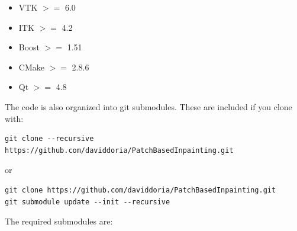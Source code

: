 \documentclass{InsightArticle}
\begin{document}
\begin{itemize}
 \item VTK $>=$ 6.0
 \item ITK $>=$ 4.2
 \item Boost $>=$ 1.51
 \item CMake $>=$ 2.8.6
 \item Qt $>=$ 4.8
\end{itemize}

The code is also organized into git submodules. These are included if you clone with:
\begin{verbatim}
git clone --recursive https://github.com/daviddoria/PatchBasedInpainting.git 
\end{verbatim}

or 

\begin{verbatim}
git clone https://github.com/daviddoria/PatchBasedInpainting.git
git submodule update --init --recursive
\end{verbatim}

The required submodules are:
\end{document}
